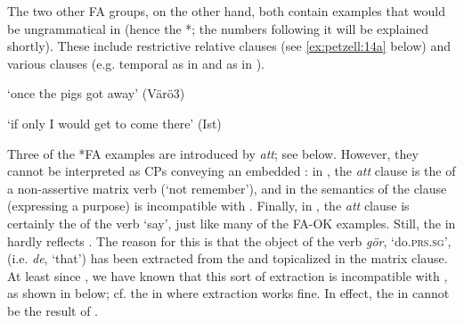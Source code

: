 \documentclass[output=paper,colorlinks,citecolor=brown,draft,draftmode]{langscibook}
\begin{document}
The two other FA groups, on the other hand, both contain examples that would be ungrammatical in  (hence the *; the numbers following it will be explained shortly). These include restrictive relative clauses (see \ref{ex:petzell:14a} below) and various  clauses (e.g. temporal as in  and  as in ).


\ea\label{ex:petzell:14}

\glt `once the pigs got away’ (Värö3)

\glt `if only I would get to come there’ (Ist)
\z
\z


Three of the *FA examples are introduced by \textit{att}; see  below. However, they cannot be interpreted as CPs conveying an embedded : in , the \textit{att} clause is the  of a non-assertive matrix verb (‘not remember’), and in  the semantics of the clause (expressing a purpose) is incompatible with . Finally, in , the \textit{att} clause is certainly the  of the verb ‘say’, just like many of the FA-OK examples. Still, the  in  hardly reflects  . The reason for this is that the object of the verb \textit{gör}, ‘do.\textsc{prs}.\textsc{sg}’, (i.e. \textit{de}, ‘that’) has been extracted from the  and topicalized in the matrix clause. At least since \citet{Holmberg1986}, we have known that this sort of extraction is incompatible with , as shown in  below; cf. the  in  where extraction works fine. In effect, the  in  cannot be the result of .
\end{document}

